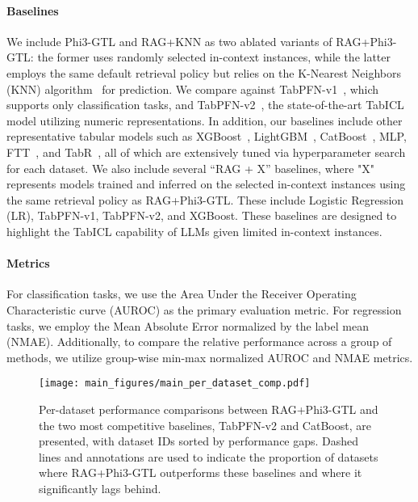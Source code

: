 \paragraph{Baselines}
We include Phi3-GTL and RAG+KNN as two ablated variants of RAG+Phi3-GTL: the former uses randomly selected in-context instances, while the latter employs the same default retrieval policy but relies on the K-Nearest Neighbors (KNN) algorithm~\citep{fix1951knn,cover1967knn_cls} for prediction.
We compare against TabPFN-v1~\citep{hollmann2023TabPFN}, which supports only classification tasks, and TabPFN-v2~\citep{hollmann2025TabPFNv2}, the state-of-the-art TabICL model utilizing numeric representations.
In addition, our baselines include other representative tabular models such as XGBoost~\citep{chen2016XGBoost}, LightGBM~\citep{ke2017LightGBM}, CatBoost~\citep{prokhorenkova2018catboost}, MLP, FTT~\citep{gorishniy2021revisit_tab_dnn}, and TabR~\citep{gorishniy2024TabR}, all of which are extensively tuned via hyperparameter search for each dataset.
We also include several ``RAG + X'' baselines, where "X" represents models trained and inferred on the selected in-context instances using the same retrieval policy as RAG+Phi3-GTL. These include Logistic Regression (LR), TabPFN-v1, TabPFN-v2, and XGBoost.
These baselines are designed to highlight the TabICL capability of LLMs given limited in-context instances.

\paragraph{Metrics}
For classification tasks, we use the Area Under the Receiver Operating Characteristic curve (AUROC) as the primary evaluation metric. For regression tasks, we employ the Mean Absolute Error normalized by the label mean (NMAE).
Additionally, to compare the relative performance across a group of methods, we utilize group-wise min-max normalized AUROC and NMAE metrics.


\begin{figure*}[t]
\vskip 0.2in
\begin{center}
\centerline{\texttt{[image: main\_figures/main\_per\_dataset\_comp.pdf]}}
\caption{
    Per-dataset performance comparisons between RAG+Phi3-GTL and the two most competitive baselines, TabPFN-v2 and CatBoost, are presented, with dataset IDs sorted by performance gaps. Dashed lines and annotations are used to indicate the proportion of datasets where RAG+Phi3-GTL outperforms these baselines and where it significantly lags behind.
}
\label{fig:per_dataset_comp}
\end{center}
\vskip -0.2in
\end{figure*}



